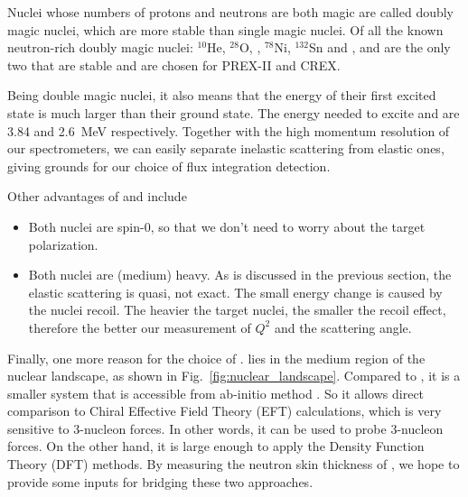 Nuclei whose numbers of protons and neutrons are both magic are called doubly
magic nuclei, which are more stable than single magic nuclei. Of all the known
neutron-rich doubly magic nuclei: ${}^{10}$He, ${}^{28}$O, \Ca, ${}^{78}$Ni, 
${}^{132}$Sn and \Pb, \Ca and \Pb are the only two that are stable and are chosen
for PREX-II and CREX.

Being double magic nuclei, it also means that the energy of their first 
excited state is much larger than their ground state. The energy needed to
excite \Ca and \Pb are 3.84 and 2.6~MeV respectively. 
Together with the high momentum resolution of our spectrometers, we can easily
separate inelastic scattering from elastic ones, giving grounds for our choice of
flux integration detection.

Other advantages of \Ca and \Pb include
\begin{itemize}
    \item Both nuclei are spin-0, so that we don't need to worry about the target polarization.
    \item Both nuclei are (medium) heavy. As is discussed in the previous section, 
	the elastic scattering is quasi, not exact. The small energy change is 
	caused by the nuclei recoil. The heavier the target nuclei, the smaller the 
	recoil effect, therefore the better our measurement of $Q^2$ and the 
	scattering angle.
\end{itemize}

Finally, one more reason for the choice of \Ca. \Ca lies in the medium region of the nuclear 
landscape, as shown in Fig.~\ref{fig:nuclear_landscape}. Compared to \Pb, it
is a smaller system that is accessible from ab-initio method \cite{Hagen2016}.
So it allows direct comparison to Chiral Effective Field Theory (EFT) calculations,
which is very sensitive to 3-nucleon forces. In other words, it can be used
to probe 3-nucleon forces. On the other hand, it is large enough to apply the
Density Function Theory (DFT) methods. By measuring the neutron skin thickness of \Ca, 
we hope to provide some inputs for bridging these two approaches. 

